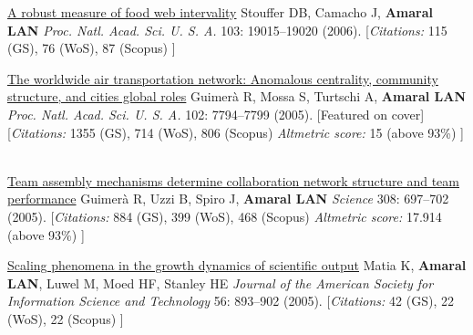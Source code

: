 \NumberedItem{\makebox[0.8cm][r]{[66]}}
\href{/people/amaral/a-robust-measure-of-food-web-intervality}
{A robust measure of food web intervality}
\newline
Stouffer DB, Camacho J, {\textbf{Amaral LAN}}
\newline
\textit{Proc. Natl. Acad. Sci. U. S. A.}
    103:
19015--19020 (2006).
    \newline
    \hfill [{\em{Citations:}} 115 (GS),
    76 (WoS), 87 (Scopus)
    ]
\newline
\Gap
~
\Gap

\NumberedItem{\makebox[0.8cm][r]{[65]}}
\href{/people/amaral/the-worldwide-air-transportation-network-anomalous-centrality-community-structure-and-cities-global-roles}
{The worldwide air transportation network: Anomalous centrality, community structure, and cities global roles}
\newline
Guimer\`a R, Mossa S, Turtschi A, {\textbf{Amaral LAN}}
\newline
\textit{Proc. Natl. Acad. Sci. U. S. A.}
    102:
7794--7799 (2005).
    [Featured on cover]
    \newline
    \hfill [{\em{Citations:}} 1355 (GS),
    714 (WoS), 806 (Scopus)
        {\hspace*{1cm} \em{Altmetric score:}}  15 (above 93\%)
    ]
\newline
\Gap
~
\Gap

\NumberedItem{\makebox[0.8cm][r]{[64]}}
\href{/people/amaral/team-assembly-mechanisms-determine-collaboration-network-structure-and-team-performance}
{Team assembly mechanisms determine collaboration network structure and team performance}
\newline
Guimer\`a R, Uzzi B, Spiro J, {\textbf{Amaral LAN}}
\newline
\textit{Science}
    308:
697--702 (2005).
    \newline
    \hfill [{\em{Citations:}} 884 (GS),
    399 (WoS), 468 (Scopus)
        {\hspace*{1cm} \em{Altmetric score:}}  17.914 (above 93\%)
    ]
\newline
\Gap
~
\Gap

\NumberedItem{\makebox[0.8cm][r]{[63]}}
\href{/people/amaral/scaling-phenomena-in-the-growth-dynamics-of-scientific-output}
{Scaling phenomena in the growth dynamics of scientific output}
\newline
Matia K, {\textbf{Amaral LAN}}, Luwel M, Moed HF, Stanley HE
\newline
\textit{Journal of the American Society for Information Science and Technology}
    56:
893--902 (2005).
    \newline
    \hfill [{\em{Citations:}} 42 (GS),
    22 (WoS), 22 (Scopus)
    ]
\newline
\Gap
~
\Gap

